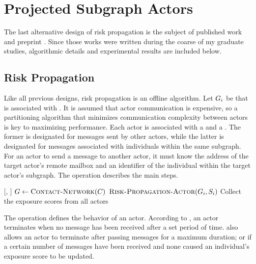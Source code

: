 \section{Projected Subgraph Actors}\label{sec:projected-subgraphs}

The last alternative design of risk propagation is the subject of published work \citep{Tatton2022b} and preprint \citep{Tatton2022a}. Since those works were written during the coarse of my graduate studies, algorithmic details and experimental results are included below.

\subsection{Risk Propagation}

Like all previous designs, risk propagation is an offline algorithm. Let $G_i$ be  that is associated with . It is assumed that actor communication is expensive, so a partitioning algorithm \citep{Buluc2016} that minimizes communication complexity between actors is key to maximizing performance. Each actor is associated with a  and a . The former is designated for messages sent by other actors, while the latter is designated for messages associated with individuals within the same subgraph. For an actor to send a message to another actor, it must know the address of the target actor's remote mailbox and an identifier of the individual within the target actor's subgraph. The \cRiskPropagationMain{} operation describes the main steps.

\begin{function}{\nRiskPropagationMain}[\vScores, \vContacts]
  \State $\vGraph \assign \Call{Contact-Network}{\vContacts}$
    \State $\cRiskPropagationActor[\vGraph_i, \vScores_i]$
  \EndFor
  \State Collect the exposure scores from all actors
\end{function}

The \cRiskPropagationActor{} operation defines the behavior of an actor. According to \citet{Tatton2022a,Tatton2022b}, an actor terminates when no message has been received after a set period of time. \citet{Tatton2022a} also allows an actor to terminate after passing messages for a maximum duration; or if a certain number of messages have been received and none caused an individual's exposure score to be updated.

